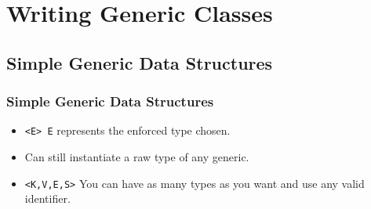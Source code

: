\documentclass{beamer}
\begin{document}
\section{Writing Generic Classes}
\subsection{Simple Generic Data Structures}
\begin{frame}
\frametitle{Simple Generic Data Structures}
\begin{itemize}
\item \texttt{<E> E} represents the {\color{red} enforced} type chosen.
\item Can still instantiate a {\color{orange} raw type} of any generic.
\item \texttt{<K,V,E,S>} You can have as many types as you want and use any valid identifier.
\end{itemize}
\end{frame}
\end{document}
